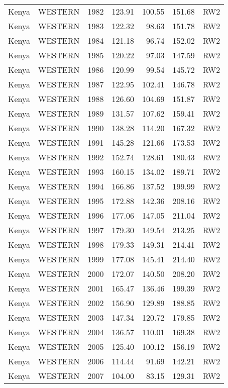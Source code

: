 \begin{longtable}{lllrrrl}
  Kenya & WESTERN & 1982 & 123.91 & 100.55 & 151.68 & RW2 \\ 
  Kenya & WESTERN & 1983 & 122.32 & 98.63 & 151.78 & RW2 \\ 
  Kenya & WESTERN & 1984 & 121.18 & 96.74 & 152.02 & RW2 \\ 
  Kenya & WESTERN & 1985 & 120.22 & 97.03 & 147.59 & RW2 \\ 
  Kenya & WESTERN & 1986 & 120.99 & 99.54 & 145.72 & RW2 \\ 
  Kenya & WESTERN & 1987 & 122.95 & 102.41 & 146.78 & RW2 \\ 
  Kenya & WESTERN & 1988 & 126.60 & 104.69 & 151.87 & RW2 \\ 
  Kenya & WESTERN & 1989 & 131.57 & 107.62 & 159.41 & RW2 \\ 
  Kenya & WESTERN & 1990 & 138.28 & 114.20 & 167.32 & RW2 \\ 
  Kenya & WESTERN & 1991 & 145.28 & 121.66 & 173.53 & RW2 \\ 
  Kenya & WESTERN & 1992 & 152.74 & 128.61 & 180.43 & RW2 \\ 
  Kenya & WESTERN & 1993 & 160.15 & 134.02 & 189.71 & RW2 \\ 
  Kenya & WESTERN & 1994 & 166.86 & 137.52 & 199.99 & RW2 \\ 
  Kenya & WESTERN & 1995 & 172.88 & 142.36 & 208.16 & RW2 \\ 
  Kenya & WESTERN & 1996 & 177.06 & 147.05 & 211.04 & RW2 \\ 
  Kenya & WESTERN & 1997 & 179.30 & 149.54 & 213.25 & RW2 \\ 
  Kenya & WESTERN & 1998 & 179.33 & 149.31 & 214.41 & RW2 \\ 
  Kenya & WESTERN & 1999 & 177.08 & 145.41 & 214.40 & RW2 \\ 
  Kenya & WESTERN & 2000 & 172.07 & 140.50 & 208.20 & RW2 \\ 
  Kenya & WESTERN & 2001 & 165.47 & 136.46 & 199.39 & RW2 \\ 
  Kenya & WESTERN & 2002 & 156.90 & 129.89 & 188.85 & RW2 \\ 
  Kenya & WESTERN & 2003 & 147.34 & 120.72 & 179.85 & RW2 \\ 
  Kenya & WESTERN & 2004 & 136.57 & 110.01 & 169.38 & RW2 \\ 
  Kenya & WESTERN & 2005 & 125.40 & 100.12 & 156.19 & RW2 \\ 
  Kenya & WESTERN & 2006 & 114.44 & 91.69 & 142.21 & RW2 \\ 
  Kenya & WESTERN & 2007 & 104.00 & 83.15 & 129.31 & RW2 \\ 

\end{longtable}
